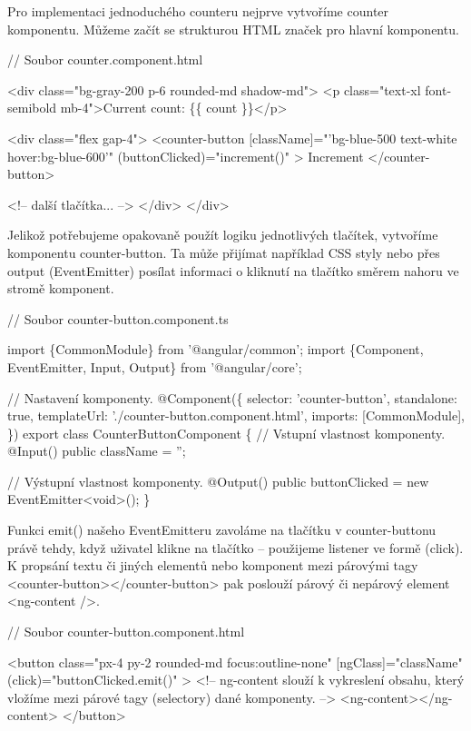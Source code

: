 Pro implementaci jednoduchého counteru nejprve vytvoříme counter komponentu. Můžeme začít se strukturou HTML značek pro hlavní komponentu.

\begin{prog}
// Soubor counter.component.html

<div class="bg-gray-200 p-6 rounded-md shadow-md">
  <p class="text-xl font-semibold mb-4">Current count: \{\{ count \}\}</p>

  <div class="flex gap-4">
    <counter-button
      [className]="'bg-blue-500 text-white hover:bg-blue-600'"
      (buttonClicked)="increment()"
    >
      Increment
    </counter-button>

    <!-- další tlačítka... -->
  </div>
</div>
\end{prog}

Jelikož potřebujeme opakovaně použít logiku jednotlivých tlačítek, vytvoříme komponentu counter-button. 
Ta může přijímat například CSS styly nebo přes output (EventEmitter) posílat informaci o kliknutí na tlačítko směrem nahoru ve stromě komponent.

\begin{prog}
// Soubor counter-button.component.ts

import \{CommonModule\} from '@angular/common';
import \{Component, EventEmitter, Input, Output\} from '@angular/core';

// Nastavení komponenty.
@Component(\{
  selector: 'counter-button',
  standalone: true,
  templateUrl: './counter-button.component.html',
  imports: [CommonModule],
\})
export class CounterButtonComponent \{
  // Vstupní vlastnost komponenty.
  @Input() public className = '';

  // Výstupní vlastnost komponenty.
  @Output() public buttonClicked = new EventEmitter<void>();
\}
\end{prog}

Funkci emit() našeho EventEmitteru zavoláme na tlačítku v counter-buttonu právě tehdy, když uživatel klikne na tlačítko -- použijeme listener ve formě (click). 
K propsání textu či jiných elementů nebo komponent mezi párovými tagy <counter-button></counter-button> pak poslouží párový či nepárový element <ng-content />.

\begin{prog}
// Soubor counter-button.component.html

<button
  class="px-4 py-2 rounded-md focus:outline-none"
  [ngClass]="className"
  (click)="buttonClicked.emit()"
>
  <!-- ng-content slouží k vykreslení obsahu, který vložíme
   mezi párové tagy (selectory) dané komponenty. -->
  <ng-content></ng-content>
</button>
\end{prog}

